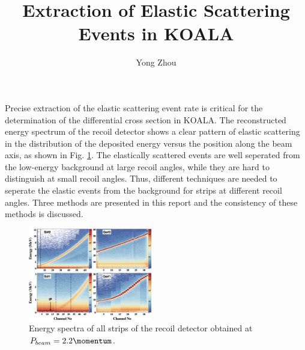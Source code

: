 \documentclass[fleqn,twocolumn,a4paper]{ikpar}
\begin{document}
\parindent=0pt
\frenchspacing

\title{{\bf
    Extraction of Elastic Scattering Events in KOALA
}}
\author{Yong Zhou
}

\maketitle

Precise extraction of the elastic scattering event rate is critical for the
determination of the differential cross section in KOALA.
The reconstructed energy spectrum of the recoil detector shows a clear pattern of
elastic scattering in the distribution of the deposited energy versus the position along the beam axis, as shown in Fig. \ref{fig:energy_vs_strips}.
The elastically scattered events are well seperated from the low-energy background at large
recoil angles, while they are hard to distinguish at small recoil angles.
Thus, different techniques are needed to seperate the elastic events from the
background for strips at different recoil angles.
Three methods are presented in this report and the consistency of these methods is discussed.
\begin{figure}[b!]
	\includegraphics[width=0.48\textwidth]{./energy_vs_strips.png}
  \caption{Energy spectra of all strips of the recoil detector obtained at
    $P_{beam} = 2.2 \si{\momentum}$.}
  \label{fig:energy_vs_strips}
\end{figure}

\par
\medskip
\end{document}
